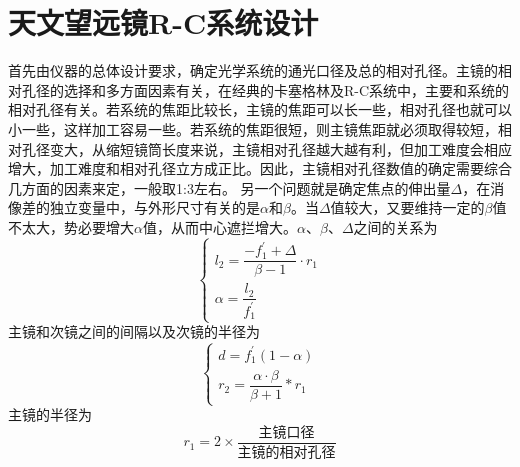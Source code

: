 \section{天文望远镜R-C系统设计}
首先由仪器的总体设计要求，确定光学系统的通光口径及总的相对孔径。主镜的相对孔径的选择和多方面因素有关，在经典的卡塞格林及R-C系统中，主要和系统的相对孔径有关。若系统的焦距比较长，主镜的焦距可以长一些，相对孔径也就可以小一些，这样加工容易一些。若系统的焦距很短，则主镜焦距就必须取得较短，相对孔径变大，从缩短镜筒长度来说，主镜相对孔径越大越有利，但加工难度会相应增大，加工难度和相对孔径立方成正比。因此，主镜相对孔径数值的确定需要综合几方面的因素来定，一般取1:3左右。
另一个问题就是确定焦点的伸出量$ \Delta $，在消像差的独立变量中，与外形尺寸有关的是$ \alpha $和$ \beta $。当$ \Delta $值较大，又要维持一定的$ \beta $值不太大，势必要增大$ \alpha $值，从而中心遮拦增大。$ \alpha $、$ \beta $、$ \Delta $之间的关系为
\begin{equation*}
\left\{ 
\begin{array}{l}  
	l_2 = \dfrac{-f_{1}^{'}+\Delta}{\beta -1}\cdot r_1 
	\\
	\alpha = \dfrac{l_2}{f_1 ^{'}}
\end{array}
\right.  
\end{equation*}
主镜和次镜之间的间隔以及次镜的半径为
\begin{equation*}
\left\{  \begin{array}{l}   d = f_1^{'}(1-\alpha) \\
	 r_2 = \dfrac{\alpha \cdot \beta}{\beta + 1}*r_1 \end{array} \right.
\end{equation*}
主镜的半径为
$$r_1 = 2 \times \dfrac{\text{主镜口径}}{\text{主镜的相对孔径}}$$

